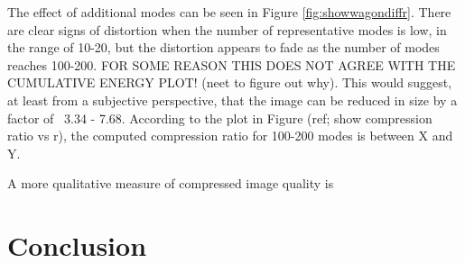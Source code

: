 \documentclass[conference]{IEEEtran}
\begin{document}
    The effect of additional modes can be seen in Figure \ref{fig:showwagondiffr}. There are clear signs of distortion when the number of representative modes is low, in the range of 10-20, but the distortion appears to fade as the number of modes reaches 100-200. FOR SOME REASON THIS DOES NOT AGREE WITH THE CUMULATIVE ENERGY PLOT! (neet to figure out why). This would suggest, at least from a subjective perspective, that the image can be reduced in size by a factor of ~3.34 - 7.68. According to the plot in Figure (ref; show compression ratio vs r), the computed compression ratio for 100-200 modes is between X and Y.


    A more qualitative measure of compressed image quality is 

    




    \section{Conclusion}
    

    \nocite{jaradet_svd_image_compression}
    \nocite{shlens_2014_tutorial}
    \nocite{omar_image_compression}
    \nocite{xu_color_conversion}
    \newpage
    {}
    
\end{document}
